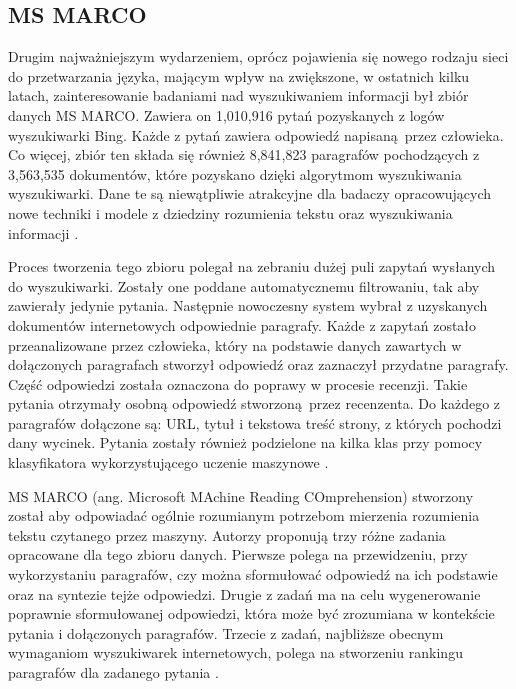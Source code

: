 \subsection{MS MARCO}

Drugim najważniejszym wydarzeniem, oprócz pojawienia się nowego rodzaju sieci do przetwarzania języka, mającym wpływ na zwiększone, w ostatnich kilku latach, zainteresowanie badaniami nad wyszukiwaniem informacji był zbiór danych MS MARCO. Zawiera on 1,010,916 pytań pozyskanych z logów wyszukiwarki Bing. Każde z pytań zawiera odpowiedź napisaną przez człowieka. Co więcej, zbiór ten składa się również 8,841,823 paragrafów pochodzących z 3,563,535 dokumentów, które pozyskano dzięki algorytmom wyszukiwania wyszukiwarki. Dane te są niewątpliwie atrakcyjne dla badaczy opracowujących nowe techniki i modele z dziedziny rozumienia tekstu oraz wyszukiwania informacji \autocite{bajaj2016ms}. \newline

Proces tworzenia tego zbioru polegał na zebraniu dużej puli zapytań wysłanych do wyszukiwarki. Zostały one poddane automatycznemu filtrowaniu, tak aby zawierały jedynie pytania. Następnie nowoczesny system wybrał z uzyskanych dokumentów internetowych odpowiednie paragrafy. Każde z zapytań zostało przeanalizowane przez człowieka, który na podstawie danych zawartych w dołączonych paragrafach stworzył odpowiedź oraz zaznaczył przydatne paragrafy. Część odpowiedzi została oznaczona do poprawy w procesie recenzji. Takie pytania otrzymały osobną odpowiedź stworzoną przez recenzenta. Do każdego z paragrafów dołączone są: URL, tytuł i tekstowa treść strony, z których pochodzi dany wycinek. Pytania zostały również podzielone na kilka klas przy pomocy klasyfikatora wykorzystującego uczenie maszynowe \autocite{bajaj2016ms}. \newline

MS MARCO (ang. Microsoft MAchine Reading COmprehension) stworzony został aby odpowiadać ogólnie rozumianym potrzebom mierzenia rozumienia tekstu czytanego przez maszyny. Autorzy proponują trzy różne zadania opracowane dla tego zbioru danych. Pierwsze polega na przewidzeniu, przy wykorzystaniu paragrafów, czy można sformułować odpowiedź na ich podstawie oraz na syntezie tejże odpowiedzi. Drugie z zadań ma na celu wygenerowanie poprawnie sformułowanej odpowiedzi, która może być zrozumiana w kontekście pytania i dołączonych paragrafów. Trzecie z zadań, najbliższe obecnym wymaganiom wyszukiwarek internetowych, polega na stworzeniu rankingu paragrafów dla zadanego pytania \autocite{bajaj2016ms}. 

